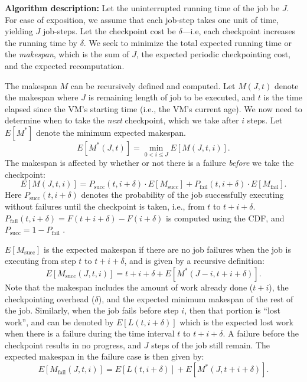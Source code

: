 
\noindent \textbf{Algorithm description:}
Let the uninterrupted running time of the job be $J$.
For ease of exposition, we assume that each job-step takes one unit of time, yielding $J$ job-steps. 
Let the checkpoint cost be $\delta$---i.e, each checkpoint increases the running time by $\delta$. 
We seek to minimize the total expected running time or the \emph{makespan}, which is the sum of $J$, the expected periodic checkpointing cost, and the expected recomputation. 

The makespan $M$ can be recursively defined and computed.
Let $M(J, t)$ denote the makespan where $J$ is remaining length of job to be executed, and $t$ is the time elapsed since the  VM's starting time (i.e., the VM's current age). 
We now need to determine when to take the \emph{next} checkpoint, which we take after $i$ steps. Let $E[M^*]$ denote the minimum expected makespan.
\begin{equation}
  \label{eq:m0}
  E[M^*(J, t)] = \min_{0<i\leq J}{E[M(J, t, i)]}.
\end{equation}
The makespan is affected by whether or not there is a failure \emph{before} we take the checkpoint: 
\begin{equation}
  \label{eq:m1}
E[M(J, t, i)] = P_{\text{succ}}(t, i+\delta) \cdot E[M_{\text{succ}}] + P_{\text{fail}}(t, i+\delta) \cdot E[M_{\text{fail}}].
\end{equation}
Here $P_{\text{succ}}(t, i+\delta)$ denotes the probability of the job successfully executing without failures until the checkpoint is taken, i.e., from $t$ to $t+i+\delta$. $P_{\text{fail}}(t, i+\delta) = F(t+i+\delta)-F(i+\delta)$ is computed using the CDF, 
and $P_{\text{succ}} = 1 - P_{\text{fail}}$ .


$E[M_{\text{succ}}]$ is the expected makespan if there are no job failures when the job is executing from step $t$ to $t+i+\delta$, and is given by a recursive definition:
\begin{equation}
  \label{eq:msuc}
E[M_{\text{succ}}(J, t, i)] = t+i+\delta + E[M^*(J-i, t+i+\delta)].  
\end{equation}
\noindent Note that the makespan includes the amount of work already done ($t+i$), the checkpointing overhead ($\delta$), and the expected minimum makespan of the rest of the job. 
Similarly, when the job fails before step $i$, then that portion is ``lost work'', and can be denoted by $E[L(t, i+\delta)]$ which is the expected lost work when there is a failure during the time interval $t$ to $t+i+\delta$.
A failure before the checkpoint results in no progress, and $J$ steps of the job still remain.
The expected makespan in the failure case is then given by:
\begin{equation}
  \label{eq:mfail}
 E[M_{\text{fail}}(J, t, i)] = E[L(t, i+\delta)] + E[M^*(J, t+i+\delta)].
\end{equation}



